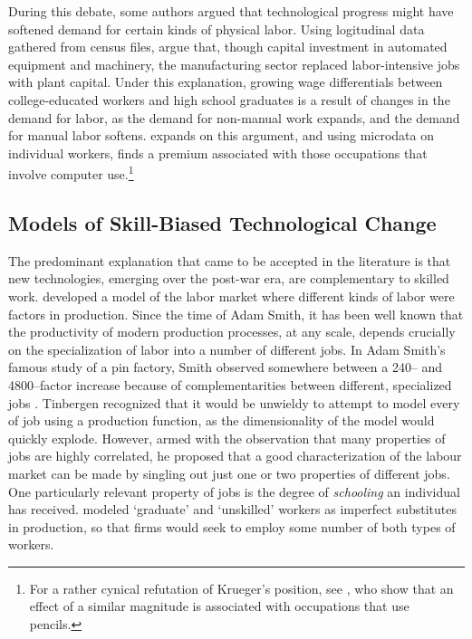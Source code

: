 During this debate, some authors argued that technological progress might have softened demand for certain kinds of physical labor. Using logitudinal data gathered from census files, \citet{Davis1991} argue that, though capital investment in automated equipment and machinery, the manufacturing sector  replaced labor-intensive jobs with plant capital. Under this explanation, growing wage differentials between college-educated workers and high school graduates is a result of changes in the demand for labor, as the demand for non-manual work expands, and the demand for manual labor softens. \citet{Krueger1993} expands on this argument, and using microdata on individual workers, finds a premium associated with those occupations that involve computer use.\footnote{For a rather cynical refutation of Krueger's position, see \citet{DiNardo1997}, who show that an effect of a similar magnitude is associated with occupations that use pencils.}

\subsection{Models of Skill-Biased Technological Change}

The predominant explanation that came to be accepted in the literature is that new technologies, emerging over the post-war era, are complementary to skilled work. \citet{Tinbergen1974,Tinbergen1975} developed a model of the labor market where different kinds of labor were factors in production. Since the time of Adam Smith, it has been well known that the productivity of modern production processes, at any scale, depends crucially on the specialization of labor into a number of different jobs. In Adam Smith's famous study of a pin factory, Smith observed somewhere between a 240-- and 4800--factor increase because of complementarities between different, specialized jobs \citet[I.3]{Smith1776}. Tinbergen recognized that it would be unwieldy to attempt to model every of job using a production function, as the dimensionality of the model would quickly explode. However, armed with the observation that many properties of jobs are highly correlated, he proposed that a good characterization of the labour market can be made by singling out just one or two properties of different jobs. One particularly relevant property of jobs is the degree of {\em schooling} an individual has received. \citet{Tinbergen1974} modeled `graduate' and `unskilled' workers as imperfect substitutes in production, so that firms would seek to employ some number of both types of workers. 

